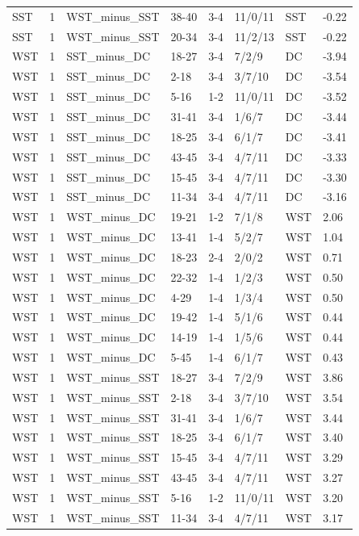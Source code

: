 \begin{table}[!h]
\begin{tabular}[t]{lrllllll}
SST & 1 & WST_minus_SST & 38-40 & 3-4 & 11/0/11 & SST & -0.22\\
SST & 1 & WST_minus_SST & 20-34 & 3-4 & 11/2/13 & SST & -0.22\\
WST & 1 & SST_minus_DC & 18-27 & 3-4 & 7/2/9 & DC & -3.94\\
\addlinespace
WST & 1 & SST_minus_DC & 2-18 & 3-4 & 3/7/10 & DC & -3.54\\
WST & 1 & SST_minus_DC & 5-16 & 1-2 & 11/0/11 & DC & -3.52\\
WST & 1 & SST_minus_DC & 31-41 & 3-4 & 1/6/7 & DC & -3.44\\
WST & 1 & SST_minus_DC & 18-25 & 3-4 & 6/1/7 & DC & -3.41\\
WST & 1 & SST_minus_DC & 43-45 & 3-4 & 4/7/11 & DC & -3.33\\
\addlinespace
WST & 1 & SST_minus_DC & 15-45 & 3-4 & 4/7/11 & DC & -3.30\\
WST & 1 & SST_minus_DC & 11-34 & 3-4 & 4/7/11 & DC & -3.16\\
WST & 1 & WST_minus_DC & 19-21 & 1-2 & 7/1/8 & WST & 2.06\\
WST & 1 & WST_minus_DC & 13-41 & 1-4 & 5/2/7 & WST & 1.04\\
WST & 1 & WST_minus_DC & 18-23 & 2-4 & 2/0/2 & WST & 0.71\\
\addlinespace
WST & 1 & WST_minus_DC & 22-32 & 1-4 & 1/2/3 & WST & 0.50\\
WST & 1 & WST_minus_DC & 4-29 & 1-4 & 1/3/4 & WST & 0.50\\
WST & 1 & WST_minus_DC & 19-42 & 1-4 & 5/1/6 & WST & 0.44\\
WST & 1 & WST_minus_DC & 14-19 & 1-4 & 1/5/6 & WST & 0.44\\
WST & 1 & WST_minus_DC & 5-45 & 1-4 & 6/1/7 & WST & 0.43\\
\addlinespace
WST & 1 & WST_minus_SST & 18-27 & 3-4 & 7/2/9 & WST & 3.86\\
WST & 1 & WST_minus_SST & 2-18 & 3-4 & 3/7/10 & WST & 3.54\\
WST & 1 & WST_minus_SST & 31-41 & 3-4 & 1/6/7 & WST & 3.44\\
WST & 1 & WST_minus_SST & 18-25 & 3-4 & 6/1/7 & WST & 3.40\\
WST & 1 & WST_minus_SST & 15-45 & 3-4 & 4/7/11 & WST & 3.29\\
\addlinespace
WST & 1 & WST_minus_SST & 43-45 & 3-4 & 4/7/11 & WST & 3.27\\
WST & 1 & WST_minus_SST & 5-16 & 1-2 & 11/0/11 & WST & 3.20\\
WST & 1 & WST_minus_SST & 11-34 & 3-4 & 4/7/11 & WST & 3.17\\

\end{tabular}
\end{table}

